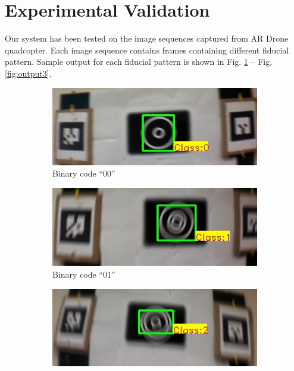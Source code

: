 \documentclass[runningheads]{llncs}
\begin{document}
\section{Experimental Validation}

Our system has been tested on the image sequences captured from AR Drone
quadcopter. Each image sequence contains frames containing different fiducial
pattern. Sample output for each fiducial pattern is shown in Fig.
\ref{fig:output0} -- Fig. \ref{fig:output3}.

\begin{figure}
\begin{subfigure}{0.5\textwidth}
\centering
  \includegraphics[width=\linewidth]{output_00.jpg}
  \caption{Binary code ``00''}
  \label{fig:output0}
\end{subfigure}
\begin{subfigure}{0.5\textwidth}
\centering
  \includegraphics[width=\linewidth]{output_01.jpg}
  \caption{Binary code ``01''}
  \label{fig:output1}
\end{subfigure}
\begin{subfigure}{0.5\textwidth}
\centering
  \includegraphics[width=\linewidth]{output_10.jpg}

\end{subfigure}
\end{figure}
\end{document}
